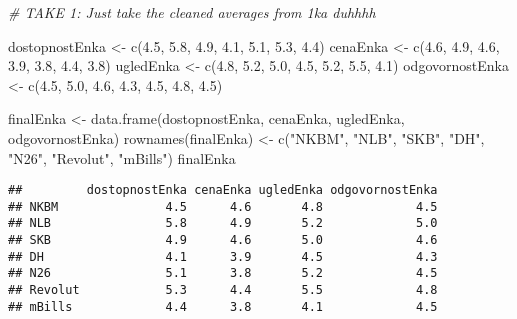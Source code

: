 \documentclass[
]{article}
\newenvironment{Shaded}{\begin{snugshade}}{\end{snugshade}}
\newcommand{\CommentTok}[1]{\textcolor[rgb]{0.56,0.35,0.01}{\textit{#1}}}
\newcommand{\FloatTok}[1]{\textcolor[rgb]{0.00,0.00,0.81}{#1}}
\newcommand{\FunctionTok}[1]{\textcolor[rgb]{0.00,0.00,0.00}{#1}}
\newcommand{\NormalTok}[1]{#1}
\newcommand{\OtherTok}[1]{\textcolor[rgb]{0.56,0.35,0.01}{#1}}
\newcommand{\StringTok}[1]{\textcolor[rgb]{0.31,0.60,0.02}{#1}}
\begin{document}
\begin{Shaded}
\begin{Highlighting}[]
\CommentTok{\# TAKE 1: Just take the cleaned averages from 1ka duhhhh}

\NormalTok{dostopnostEnka }\OtherTok{\textless{}{-}} \FunctionTok{c}\NormalTok{(}\FloatTok{4.5}\NormalTok{, }\FloatTok{5.8}\NormalTok{, }\FloatTok{4.9}\NormalTok{, }\FloatTok{4.1}\NormalTok{, }\FloatTok{5.1}\NormalTok{, }\FloatTok{5.3}\NormalTok{, }\FloatTok{4.4}\NormalTok{)}
\NormalTok{cenaEnka }\OtherTok{\textless{}{-}} \FunctionTok{c}\NormalTok{(}\FloatTok{4.6}\NormalTok{, }\FloatTok{4.9}\NormalTok{, }\FloatTok{4.6}\NormalTok{, }\FloatTok{3.9}\NormalTok{, }\FloatTok{3.8}\NormalTok{, }\FloatTok{4.4}\NormalTok{, }\FloatTok{3.8}\NormalTok{)}
\NormalTok{ugledEnka }\OtherTok{\textless{}{-}} \FunctionTok{c}\NormalTok{(}\FloatTok{4.8}\NormalTok{, }\FloatTok{5.2}\NormalTok{, }\FloatTok{5.0}\NormalTok{, }\FloatTok{4.5}\NormalTok{, }\FloatTok{5.2}\NormalTok{, }\FloatTok{5.5}\NormalTok{, }\FloatTok{4.1}\NormalTok{)}
\NormalTok{odgovornostEnka }\OtherTok{\textless{}{-}} \FunctionTok{c}\NormalTok{(}\FloatTok{4.5}\NormalTok{, }\FloatTok{5.0}\NormalTok{, }\FloatTok{4.6}\NormalTok{, }\FloatTok{4.3}\NormalTok{, }\FloatTok{4.5}\NormalTok{, }\FloatTok{4.8}\NormalTok{, }\FloatTok{4.5}\NormalTok{)}


\NormalTok{finalEnka }\OtherTok{\textless{}{-}} \FunctionTok{data.frame}\NormalTok{(dostopnostEnka, cenaEnka, ugledEnka, odgovornostEnka)}
\FunctionTok{rownames}\NormalTok{(finalEnka) }\OtherTok{\textless{}{-}} \FunctionTok{c}\NormalTok{(}\StringTok{"NKBM"}\NormalTok{, }\StringTok{"NLB"}\NormalTok{, }\StringTok{"SKB"}\NormalTok{, }\StringTok{"DH"}\NormalTok{, }\StringTok{"N26"}\NormalTok{, }\StringTok{"Revolut"}\NormalTok{, }\StringTok{"mBills"}\NormalTok{)}
\NormalTok{finalEnka}
\end{Highlighting}
\end{Shaded}

\begin{verbatim}
##         dostopnostEnka cenaEnka ugledEnka odgovornostEnka
## NKBM               4.5      4.6       4.8             4.5
## NLB                5.8      4.9       5.2             5.0
## SKB                4.9      4.6       5.0             4.6
## DH                 4.1      3.9       4.5             4.3
## N26                5.1      3.8       5.2             4.5
## Revolut            5.3      4.4       5.5             4.8
## mBills             4.4      3.8       4.1             4.5
\end{verbatim}
\end{document}
